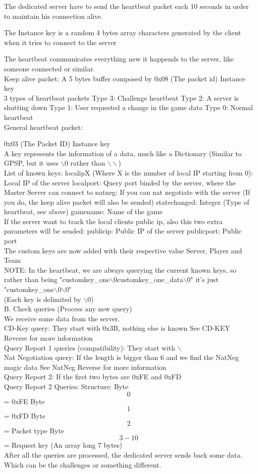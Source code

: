 \documentclass[oneside,titlepage,a4paper]{Definition/retrospy} %
\begin{document}
The dedicated server have to send the heartbeat packet each 10 seconds in order to maintain his connection
alive.

The Instance key is a random 4 bytes array characters generated by the client when it tries
to connect to the server

The heartbeat communicates everything new it happends to the server, like someone connected or similar.
\\
Keep alive packet:
A 5 bytes buffer composed by
0x08 (The packet id)
Instance key
\\
3 types of heartbeat packets
Type 3: Challenge heartbeat
Type 2: A server is shutting down
Type 1: User requested a change in the game data
Type 0: Normal heartbeat
\\
General heartbeat packet:

0x03 (The Packet ID)
Instance key
\\
A key represents the information of a data, much like a Dictionary (Similar to GPSP, but it uses $\backslash$0 rather than $\backslash\backslash$) 
\\
List of known keys:
localipX (Where X is the number of local IP starting from 0): Local IP of the server
localport: Query port binded by the server, where the Master Server can connect to
natneg: If you can nat negotiate with the server (If you do, the keep alive packet will also be sended)
statechanged: Integer (Type of heartbeat, see above)
gamename: Name of the game
\\
If the server want to track the local clients public ip, also this two extra parameters will be sended:
publicip: Public IP of the server
publicport: Public port
\\
The custom keys are now added with their respective value
Server, Player and Team
\\

NOTE: In the heartbeat, we are always querying the current known keys, so
rather than being "customkey\_one$\backslash$0customkey\_one\_data$\backslash$0" it's just "customkey\_one$\backslash$0$\backslash$0"
\\
(Each key is delimited by $\backslash$0)
\\
B. Check queries (Process any new query)
\\
We receive some data from the server.
\\
CD-Key query:
They start with 0x3B, nothing else is known
See CD-KEY Reverse for more information
\\
Query Report 1 queries (compatibility):
They start with $\backslash$
\\
Nat Negotiation query:
If the length is bigger than 6 and we find the NatNeg magic data
See NatNeg Reverse for more information
\\
Query Report 2:
If the first two bytes are 0xFE and 0xFD
\\
Query Report 2 Queries:
Structure:
Byte \[0\] = 0xFE
Byte \[1\] = 0xFD
Byte \[2\] = Packet type
Byte \[3-10\] = Request key (An array long 7 bytes)
\\
After all the queries are processed, the dedicated server sends back some data.
Which can be the challenges or something different.
\end{document}
